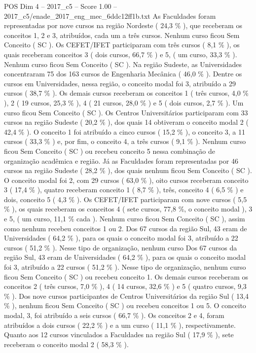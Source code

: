\begin{textsample}{POS Dim 4 – 2017\_c5 – Score 1.00 – 2017\_c5/enade\_2017\_eng\_mec\_6ddc12ff1b.txt}
As Faculdades foram representadas por nove cursos na região Nordeste ( 24,3 \% ), que receberam os conceitos 1, 2 e 3, atribuídos, cada um a três cursos.
Nenhum curso ficou Sem Conceito ( SC ).
Os CEFET/IFET participaram com três cursos ( 8,1 \% ), os quais receberam conceitos 3 ( dois cursos, 66,7 \% ) e 5, ( um curso, 33,3 \% ).
Nenhum curso ficou Sem Conceito ( SC ).
Na região Sudeste, as Universidades concentraram 75 dos 163 cursos de Engenharia Mecânica ( 46,0 \% ).
Dentre os cursos em Universidades, nessa região, o conceito modal foi 3, atribuído a 29 cursos ( 38,7 \% ).
Os demais cursos receberam os conceitos 1 ( três cursos, 4,0 \% ), 2 ( 19 cursos, 25,3 \% ), 4 ( 21 cursos, 28,0 \% ) e 5 ( dois cursos, 2,7 \% ).
Um curso ficou Sem Conceito ( SC ).
Os Centros Universitários participaram com 33 cursos na região Sudeste ( 20,2 \% ), dos quais 14 obtiveram o conceito modal 2 ( 42,4 \% ).
O conceito 1 foi atribuído a cinco cursos ( 15,2 \% ), o conceito 3, a 11 cursos ( 33,3 \% ) e, por fim, o conceito 4, a três cursos ( 9,1 \% ).
Nenhum curso ficou Sem Conceito ( SC ) ou recebeu conceito 5 nessa combinação de organização acadêmica e região.
Já as Faculdades foram representadas por 46 cursos na região Sudeste ( 28,2 \% ), dos quais nenhum ficou Sem Conceito ( SC ).
O conceito modal foi 2, com 29 cursos ( 63,0 \% ), oito cursos receberam conceito 3 ( 17,4 \% ), quatro receberam conceito 1 ( 8,7 \% ), três, conceito 4 ( 6,5 \% ) e dois, conceito 5 ( 4,3 \% ).
Os CEFET/IFET participaram com nove cursos ( 5,5 \% ), os quais receberam os conceitos 4 ( sete cursos, 77,8 \%, o conceito modal ), 3 e 5, ( um curso, 11,1 \% cada ).
Nenhum curso ficou Sem Conceito ( SC ), assim como nenhum recebeu conceitos 1 ou 2.
Dos 67 cursos da região Sul, 43 eram de Universidades ( 64,2 \% ), para os quais o conceito modal foi 3, atribuído a 22 cursos ( 51,2 \% ).
Nesse tipo de organização, nenhum curso Dos 67 cursos da região Sul, 43 eram de Universidades ( 64,2 \% ), para os quais o conceito modal foi 3, atribuído a 22 cursos ( 51,2 \% ).
Nesse tipo de organização, nenhum curso ficou Sem Conceito ( SC ) ou recebeu conceito 1.
Os demais cursos receberam os conceitos 2 ( três cursos, 7,0 \% ), 4 ( 14 cursos, 32,6 \% ) e 5 ( quatro cursos, 9,3 \% ).
Dos nove cursos participantes de Centros Universitários da região Sul ( 13,4 \% ), nenhum ficou Sem Conceito ( SC ) ou recebeu conceitos 1 ou 5.
O conceito modal, 3, foi atribuído a seis cursos ( 66,7 \% ).
Os conceitos 2 e 4, foram atribuídos a dois cursos ( 22,2 \% ) e a um curso ( 11,1 \% ), respectivamente.
Quanto aos 12 cursos vinculados a Faculdades na região Sul ( 17,9 \% ), sete receberam o conceito modal 2 ( 58,3 \% ).

\end{textsample}
